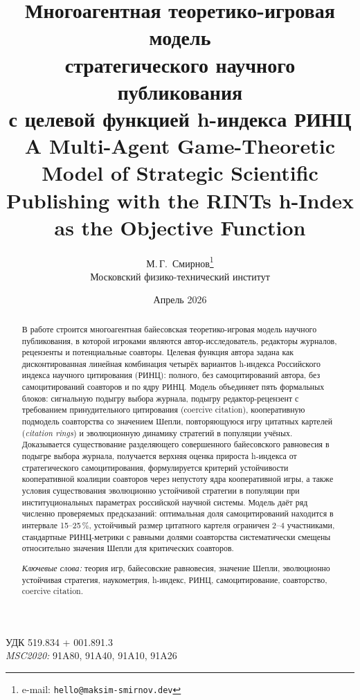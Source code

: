 \documentclass[12pt,a4paper]{article}
\title{\textbf{Многоагентная теоретико-игровая модель
    \\ стратегического научного публикования \\ с целевой функцией
  h-индекса РИНЦ}\\[0.3em]
  \large A Multi-Agent Game-Theoretic Model of Strategic Scientific
Publishing with the RINTs h-Index as the Objective Function}
\author{М.\,Г.~Смирнов\thanks{e-mail:
  \texttt{hello@maksim-smirnov.dev}}\\[0.3em]
\small Московский физико-технический институт}
\date{Апрель 2026}
\theoremstyle{definition}
\begin{document}
\maketitle

\begin{center}
  \small УДК 519.834 + 001.891.3\\
  {\footnotesize \textit{MSC2020:} 91A80, 91A40, 91A10, 91A26}
\end{center}

\begin{abstract}
  \noindent
  В работе строится многоагентная байесовская теоретико-игровая
  модель научного публикования, в которой игроками являются
  автор-исследователь, редакторы журналов, рецензенты и потенциальные
  соавторы. Целевая функция автора задана как дисконтированная
  линейная комбинация четырёх вариантов h-индекса Российского индекса
  научного цитирования (РИНЦ): полного, без самоцитирований автора,
  без самоцитирований соавторов и по ядру РИНЦ. Модель объединяет
  пять формальных блоков: сигнальную подыгру выбора журнала, подыгру
  редактор-рецензент с требованием принудительного цитирования
  (coercive citation), кооперативную подмодель соавторства со
  значением Шепли, повторяющуюся игру цитатных картелей
  (\emph{citation rings}) и эволюционную динамику стратегий в
  популяции учёных. Доказывается существование разделяющего
  совершенного байесовского равновесия в подыгре выбора журнала,
  получается верхняя оценка прироста h-индекса от стратегического
  самоцитирования, формулируется критерий устойчивости кооперативной
  коалиции соавторов через непустоту ядра кооперативной игры, а также
  условия существования эволюционно устойчивой стратегии в популяции
  при институциональных параметрах российской научной системы. Модель
  даёт ряд численно проверяемых предсказаний: оптимальная доля
  самоцитирований находится в интервале 15--25\,\%, устойчивый размер
  цитатного картеля ограничен 2--4 участниками, стандартные
  РИНЦ-метрики с равными долями соавторства систематически смещены
  относительно значения Шепли для критических соавторов.

  \smallskip
  \noindent\textit{Ключевые слова:} теория игр, байесовские
  равновесия, значение Шепли, эволюционно устойчивая стратегия,
  наукометрия, h-индекс, РИНЦ, самоцитирование, соавторство, coercive citation.
\end{abstract}
\end{document}
